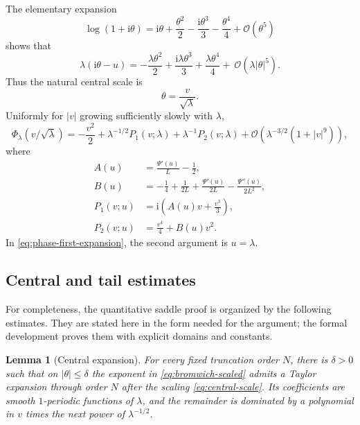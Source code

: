 \documentclass[11pt,oneside]{article}
\newtheorem{lemma}[theorem]{Lemma}
\theoremstyle{definition}
\theoremstyle{remark}
\newcommand{\ii}{\mathrm i}
\newcommand{\bigO}{\mathcal O}
\begin{document}
The elementary expansion
\begin{equation}
 \log(1+\ii\theta)
 =\ii\theta+\frac{\theta^2}{2}-\frac{\ii\theta^3}{3}
  -\frac{\theta^4}{4}+\bigO(\theta^5)                     \label{eq:log-one-itheta}
\end{equation}
shows that
\begin{equation}
 \lambda(\ii\theta-u)=-\frac{\lambda\theta^2}{2}
 +\frac{\ii\lambda\theta^3}{3}+\frac{\lambda\theta^4}{4}+\
 \bigO(\lambda|\theta|^5).                                \label{eq:gaussian-leading}
\end{equation}
Thus the natural central scale is
\begin{equation}
 \theta=\frac v{\sqrt\lambda}.                            \label{eq:central-scale}
\end{equation}
Uniformly for $|v|$ growing sufficiently slowly with $\lambda$,
\begin{equation}
 \Phi_\lambda(v/\sqrt\lambda)
 =-\frac{v^2}{2}+\lambda^{-1/2}P_1(v;\lambda)
 +\lambda^{-1}P_2(v;\lambda)
 +\bigO\!\left(\lambda^{-3/2}(1+|v|^9)\right),            \label{eq:phase-first-expansion}
\end{equation}
where
\begin{align}
 A(u)&=\frac{\Psi'(u)}L-\frac12,                           \label{eq:A-periodic}\\
 B(u)&=-\frac14+\frac1{2L}+\frac{\Psi'(u)}{2L}
       -\frac{\Psi''(u)}{2L^2},                           \label{eq:B-periodic}\\
 P_1(v;u)&=\ii\left(A(u)v+\frac{v^3}{3}\right),           \label{eq:P1}\\
 P_2(v;u)&=\frac{v^4}{4}+B(u)v^2.                         \label{eq:P2}
\end{align}
In \eqref{eq:phase-first-expansion}, the second argument is $u=\lambda$.

\subsection{Central and tail estimates}

For completeness, the quantitative saddle proof is organized by the following estimates.
They are stated here in the form needed for the argument; the formal development proves them
with explicit domains and constants.

\begin{lemma}[Central expansion]
For every fixed truncation order $N$, there is $\delta>0$ such that on
$|\theta|\le\delta$ the exponent in \eqref{eq:bromwich-scaled} admits a Taylor expansion
through order $N$ after the scaling \eqref{eq:central-scale}.  Its coefficients are smooth
$1$-periodic functions of $\lambda$, and the remainder is dominated by a polynomial in $v$
times the next power of $\lambda^{-1/2}$.
\end{lemma}
\end{document}

